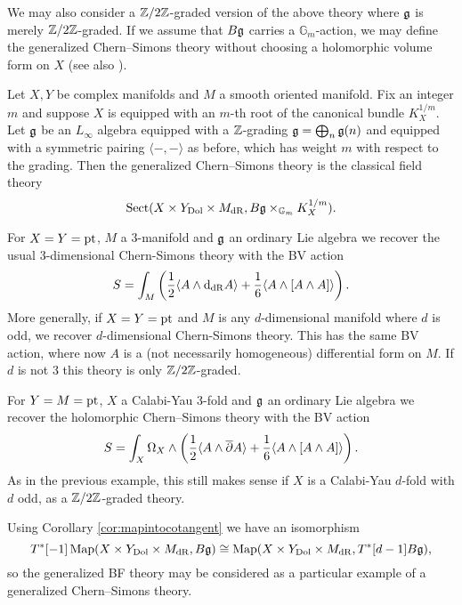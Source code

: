 \documentclass[10pt, oneside]{article}
\newcommand{\Gm}{\mathbb{G}_m}
\newcommand{\Sect}{\mathrm{Sect}}
\begin{document}
We may also consider a $\mathbb Z/2\mathbb Z$-graded version of the above theory where $\mathfrak g$ is merely $\mathbb Z/2\mathbb Z$-graded. If we assume that $B\mathfrak g$ carries a $\Gm$-action, we may define the generalized Chern--Simons theory without choosing a holomorphic volume form on $X$ (see also \cite{GinzburgRozenblyum}).

\begin{definition}
Let $X,Y$ be complex manifolds and $M$ a smooth oriented manifold. Fix an integer $m$ and suppose $X$ is equipped with an $m$-th root of the canonical bundle $K_X^{1/m}$. Let $\mathfrak g$ be an $L_\infty$ algebra equipped with a $\mathbb Z$-grading $\mathfrak g=\bigoplus_n \mathfrak g(n)$ and equipped with a symmetric pairing $\langle -, -\rangle$ as before, which has weight $m$ with respect to the grading. Then the generalized Chern--Simons theory is the classical field theory
\[\Sect(X\times Y_{\mathrm{Dol}}\times M_{\mathrm{dR}}, B\fg\times_{\Gm} K_X^{1/m}).\]
\label{def:sectChernSimons}
\end{definition}

\begin{example}
For $X=Y=\operatorname{pt}$, $M$ a 3-manifold and $\mathfrak g$ an ordinary Lie algebra we recover the usual 3-dimensional Chern-Simons theory with the BV action
\[S = \int_M \left(\frac{1}{2}\langle A\wedge {\rm d}_{\mathrm{dR}} A\rangle + \frac{1}{6}\langle A\wedge [A\wedge A]\rangle\right).\]
More generally, if $X=Y=\operatorname{pt}$ and $M$ is any $d$-dimensional manifold where $d$ is odd, we recover $d$-dimensional Chern-Simons theory.  This has the same BV action, where now $A$ is a (not necessarily homogeneous) differential form on $M$.  If $d$ is not 3 this theory is only $\mathbb Z/2\mathbb Z$-graded.
\end{example}

\begin{example}
For $Y=M=\operatorname{pt}$, $X$ a Calabi-Yau 3-fold and $\mathfrak g$ an ordinary Lie algebra we recover the holomorphic Chern--Simons theory with the BV action
\[S = \int_X \Omega_X\wedge \left(\frac{1}{2}\langle A\wedge \overline{\partial} A\rangle + \frac{1}{6}\langle A\wedge [A\wedge A]\rangle\right).\]
As in the previous example, this still makes sense if $X$ is a Calabi-Yau $d$-fold with $d$ odd, as a $\mathbb Z/2\mathbb Z$-graded theory.
\end{example}

\begin{example}
Using Corollary \ref{cor:mapintocotangent} we have an isomorphism
\[T^*[-1]\operatorname{Map}(X\times Y_{\mathrm{Dol}}\times M_{\mathrm{dR}}, B\mathfrak g)\cong \operatorname{Map}(X\times Y_{\mathrm{Dol}}\times M_{\mathrm{dR}}, T^*[d-1]B\mathfrak g),\]
so the generalized BF theory may be considered as a particular example of a generalized Chern--Simons theory.
\label{ex:CSBF}
\end{example}
\end{document}
